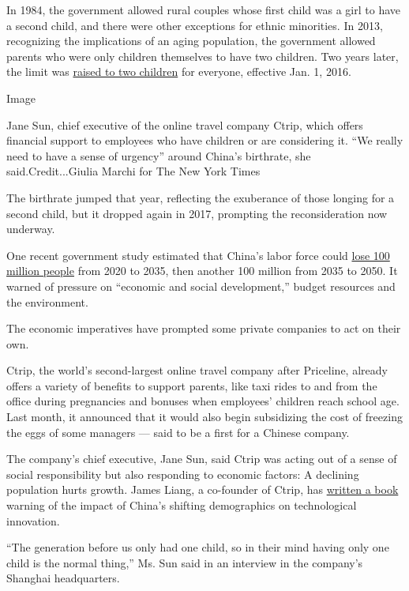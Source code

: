 In 1984, the government allowed rural couples whose first child was a
girl to have a second child, and there were other exceptions for ethnic
minorities. In 2013, recognizing the implications of an aging
population, the government allowed parents who were only children
themselves to have two children. Two years later, the limit was
\href{https://www.nytimes.com/2015/10/30/world/asia/china-end-one-child-policy.html}{raised
to two children} for everyone, effective Jan. 1, 2016.

Image

Jane Sun, chief executive of the online travel company Ctrip, which
offers financial support to employees who have children or are
considering it. ``We really need to have a sense of urgency'' around
China's birthrate, she said.Credit...Giulia Marchi for The New York
Times

The birthrate jumped that year, reflecting the exuberance of those
longing for a second child, but it dropped again in 2017, prompting the
reconsideration now underway.

One recent government study estimated that China's labor force could
\href{http://www.cppcc.gov.cn/zxww/2018/07/13/ARTI1531443023003519.shtml}{lose
100 million people} from 2020 to 2035, then another 100 million from
2035 to 2050. It warned of pressure on ``economic and social
development,'' budget resources and the environment.

The economic imperatives have prompted some private companies to act on
their own.

Ctrip, the world's second-largest online travel company after Priceline,
already offers a variety of benefits to support parents, like taxi rides
to and from the office during pregnancies and bonuses when employees'
children reach school age. Last month, it announced that it would also
begin subsidizing the cost of freezing the eggs of some managers ---
said to be a first for a Chinese company.

The company's chief executive, Jane Sun, said Ctrip was acting out of a
sense of social responsibility but also responding to economic factors:
A declining population hurts growth. James Liang, a co-founder of Ctrip,
has
\href{https://www.wiley.com/en-us/The+Demographics+of+Innovation\%3A+Why+Demographics+is+a+Key+to+the+Innovation+Race-p-9781119408925}{written
a book} warning of the impact of China's shifting demographics on
technological innovation.

``The generation before us only had one child, so in their mind having
only one child is the normal thing,'' Ms. Sun said in an interview in
the company's Shanghai headquarters.

